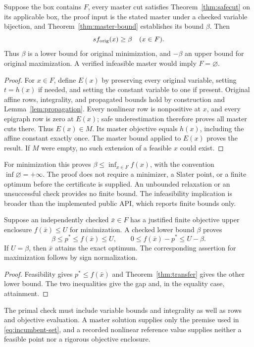 \begin{theorem}
\label{thm:transfer}
Suppose the box contains $F$, every master cut satisfies Theorem~\ref{thm:safecut} on its applicable box, the proof input is the stated master under a checked variable bijection, and Theorem~\ref{thm:master-bound} establishes its bound $\beta$. Then
\[
 s f_{\rm orig}(x)\geq\beta\quad(x\in F).
\]
Thus $\beta$ is a lower bound for original minimization, and $-\beta$ an upper bound for original maximization. A verified infeasible master would imply $F=\varnothing$.
\end{theorem}
\begin{proof}
For $x\in F$, define $E(x)$ by preserving every original variable, setting $t=h(x)$ if needed, and setting the constant variable to one if present. Original affine rows, integrality, and propagated bounds hold by construction and Lemma~\ref{lem:propagation}. Every nonlinear row is nonpositive at $x$, and every epigraph row is zero at $E(x)$; safe underestimation therefore proves all master cuts there. Thus $E(x)\in M$. Its master objective equals $h(x)$, including the affine constant exactly once. The master bound applied to $E(x)$ proves the result. If $M$ were empty, no such extension of a feasible $x$ could exist.
\end{proof}
For minimization this proves $\beta\leq\inf_{x\in F}f(x)$, with the convention $\inf\varnothing=+\infty$. The proof does not require a minimizer, a Slater point, or a finite optimum before the certificate is supplied. An unbounded relaxation or an unsuccessful check provides no finite bound. The infeasibility implication is broader than the implemented public API, which reports finite bounds only.

\begin{corollary}
\label{cor:primal}
Suppose an independently checked $\bar x\in F$ has a justified finite objective upper enclosure $f(\bar x)\leq U$ for minimization. A checked lower bound $\beta$ proves
\[
 \beta\leq p^*\leq f(\bar x)\leq U,
 \qquad 0\leq f(\bar x)-p^*\leq U-\beta.
\]
If $U=\beta$, then $\bar x$ attains the exact optimum. The corresponding assertion for maximization follows by sign normalization.
\end{corollary}
\begin{proof}
Feasibility gives $p^*\leq f(\bar x)$ and Theorem~\ref{thm:transfer} gives the other lower bound. The two inequalities give the gap and, in the equality case, attainment.
\end{proof}
The primal check must include variable bounds and integrality as well as rows and objective evaluation. A master solution supplies only the premise used in \eqref{eq:incumbent-set}, and a recorded nonlinear reference value supplies neither a feasible point nor a rigorous objective enclosure.

